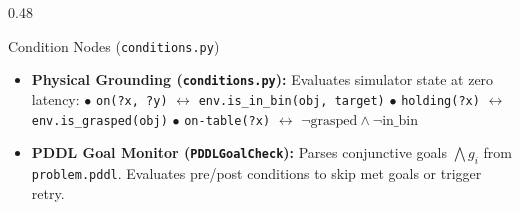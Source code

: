 \documentclass[10pt]{beamer}
\begin{document}
\begin{frame}[t]
\begin{columns}[T]
    \begin{column}{0.48\textwidth}
        \begin{block}{Condition Nodes (\texttt{conditions.py})}
            \begin{itemize}\scriptsize
                \setlength\itemsep{0.12em}
                \item \textbf{Physical Grounding (\texttt{conditions.py}):}
                \newline Evaluates simulator state at zero latency:
                \newline $\bullet$ \texttt{on(?x, ?y)} $\leftrightarrow$ \texttt{env.is\_in\_bin(obj, target)}
                \newline $\bullet$ \texttt{holding(?x)} $\leftrightarrow$ \texttt{env.is\_grasped(obj)}
                \newline $\bullet$ \texttt{on-table(?x)} $\leftrightarrow$ $\neg\text{grasped} \land \neg\text{in\_bin}$
                \item \textbf{PDDL Goal Monitor (\texttt{PDDLGoalCheck}):}
                \newline Parses conjunctive goals $\bigwedge g_i$ from \texttt{problem.pddl}. Evaluates pre/post conditions to skip met goals or trigger retry.
            \end{itemize}
        \end{block}
    \end{column}
\end{columns}
\end{frame}
\end{document}
